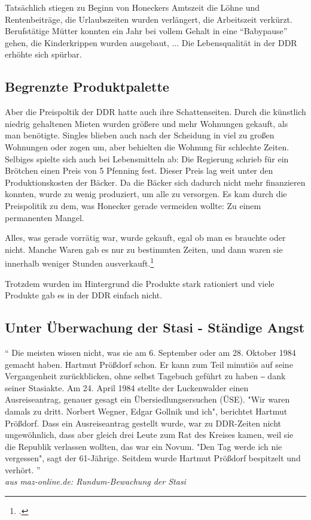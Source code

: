 \documentclass[12pt,a4paper]{article}
\begin{document}
Tatsächlich stiegen zu Beginn von Honeckers Amtszeit die Löhne und Rentenbeiträge, die Urlaubszeiten wurden verlängert, die Arbeitszeit verkürzt. Berufstätige Mütter konnten ein Jahr bei vollem Gehalt in eine \enquote{Babypause} gehen, die Kinderkrippen wurden ausgebaut, ...
Die Lebensqualität in der DDR erhöhte sich spürbar.

\subsection{Begrenzte Produktpalette}
\label{sub:begrenzt}

Aber die Preispoltik der DDR hatte auch ihre Schattenseiten. Durch die künstlich niedrig gehaltenen Mieten wurden größere und mehr Wohnungen gekauft, als man benötigte. Singles blieben auch nach der Scheidung in viel zu großen Wohnungen oder zogen um, aber behielten die Wohnung für schlechte Zeiten.
Selbiges spielte sich auch bei Lebensmitteln ab: Die Regierung schrieb für ein Brötchen einen Preis von 5 Pfenning fest. Dieser Preis lag weit unter den Produktionskosten der Bäcker. Da die Bäcker sich dadurch nicht mehr finanzieren konnten, wurde zu wenig produziert, um alle zu versorgen. Es kam durch die Preispolitik zu dem, was Honecker gerade vermeiden wollte: Zu einem permanenten Mangel. 

Alles, was gerade vorrätig war, wurde gekauft, egal ob man es brauchte oder nicht.
Manche Waren gab es nur zu bestimmten Zeiten, und dann waren sie innerhalb weniger Stunden ausverkauft.\footcite{spiegel:kap3}

Trotzdem wurden im Hintergrund die Produkte stark rationiert und viele Produkte gab es in der DDR einfach nicht.


\subsection{Unter Überwachung der Stasi - Ständige Angst}
\label{sub:stasi}

\enquote{
    Die meisten wissen nicht, was sie am 6. September oder am 28. Oktober 1984 gemacht haben. Hartmut Prößdorf schon. Er kann zum Teil minutiös auf seine Vergangenheit zurückblicken, ohne selbst Tagebuch geführt zu haben ‒ dank seiner Stasiakte. Am 24. April 1984 stellte der Luckenwalder einen Ausreiseantrag, genauer gesagt ein Übersiedlungsersuchen (ÜSE). "Wir waren damals zu dritt. Norbert Wegner, Edgar Gollnik und ich", berichtet Hartmut Prößdorf. Dass ein Ausreiseantrag gestellt wurde, war zu DDR-Zeiten nicht ungewöhnlich, dass aber gleich drei Leute zum Rat des Kreises kamen, weil sie die Republik verlassen wollten, das war ein Novum. "Den Tag werde ich nie vergessen", sagt der 61-Jährige. Seitdem wurde Hartmut Prößdorf bespitzelt und verhört.
} \\
\textit{aus maz-online.de: Rundum-Bewachung der Stasi} \\
\end{document}
